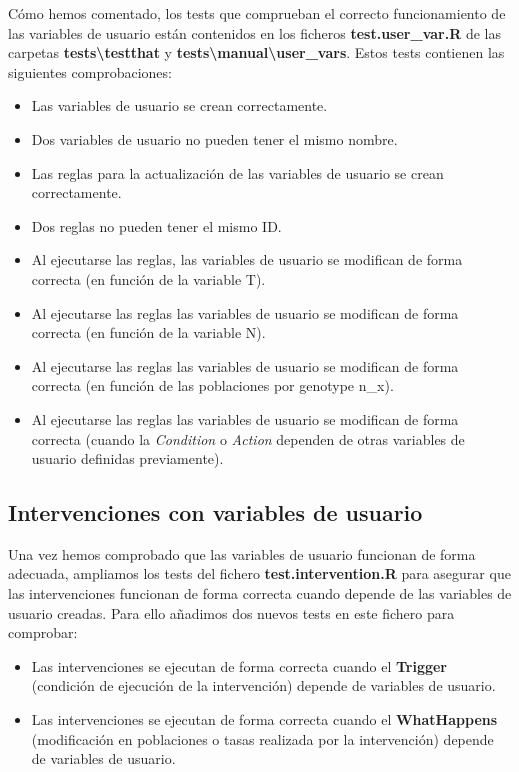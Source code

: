 Cómo hemos comentado, los tests que comprueban el correcto funcionamiento de las variables de usuario están contenidos en los ficheros \textbf{test.user\_var.R} de las carpetas \textbf{tests\textbackslash testthat} y \textbf{tests\textbackslash manual\textbackslash user\_vars}. Estos tests contienen las siguientes comprobaciones:
\begin{itemize}
	\item Las variables de usuario se crean correctamente.
	\item Dos variables de usuario no pueden tener el mismo nombre.
	\item Las reglas para la actualización de las variables de usuario se crean correctamente.
	\item Dos reglas no pueden tener el mismo ID.
	\item Al ejecutarse las reglas, las variables de usuario se modifican de forma correcta (en función de la variable T).
	\item Al ejecutarse las reglas las variables de usuario se modifican de forma correcta (en función de la variable N).
	\item Al ejecutarse las reglas las variables de usuario se modifican de forma correcta (en función de las poblaciones por \gls{genotype} n\_x).
	\item Al ejecutarse las reglas las variables de usuario se modifican de forma correcta (cuando la \textit{Condition} o \textit{Action} dependen de otras variables de usuario definidas previamente).
\end{itemize}

\subsection{Intervenciones con variables de usuario}\label{5.2.2}

Una vez hemos comprobado que las variables de usuario funcionan de forma adecuada, ampliamos los tests del fichero \textbf{test.intervention.R} para asegurar que las intervenciones funcionan de forma correcta cuando depende de las variables de usuario creadas. Para ello añadimos dos nuevos tests en este fichero para comprobar:
\begin{itemize}
	\item Las intervenciones se ejecutan de forma correcta cuando el \textbf{Trigger} (condición de ejecución de la intervención) depende de variables de usuario.
	\item Las intervenciones se ejecutan de forma correcta cuando el \textbf{WhatHappens} (modificación en poblaciones o tasas realizada por la intervención) depende de variables de usuario.
\end{itemize}

